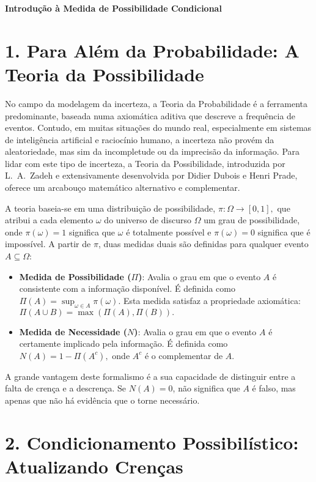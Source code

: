 \documentclass[a4paper]{article}
\begin{document}
    \begin{answer}[Questão 01]


\textbf{Introdução à Medida de Possibilidade Condicional}

\section*{1. Para Além da Probabilidade: A Teoria da Possibilidade}

No campo da modelagem da incerteza, a Teoria da Probabilidade é a ferramenta predominante, baseada numa axiomática aditiva que descreve a frequência de eventos. Contudo, em muitas situações do mundo real, especialmente em sistemas de inteligência artificial e raciocínio humano, a incerteza não provém da aleatoriedade, mas sim da incompletude ou da imprecisão da informação. Para lidar com este tipo de incerteza, a Teoria da Possibilidade, introduzida por L.~A.~Zadeh e extensivamente desenvolvida por Didier Dubois e Henri Prade, oferece um arcabouço matemático alternativo e complementar.

A teoria baseia-se em uma distribuição de possibilidade, 
\(
\pi : \Omega \to [0,1],
\)
que atribui a cada elemento $\omega$ do universo de discurso $\Omega$ um grau de possibilidade, onde $\pi(\omega) = 1$ significa que $\omega$ é totalmente possível e $\pi(\omega) = 0$ significa que é impossível. A partir de $\pi$, duas medidas duais são definidas para qualquer evento $A \subseteq \Omega$:

\begin{itemize}
  \item \textbf{Medida de Possibilidade ($\Pi$)}: Avalia o grau em que o evento $A$ é consistente com a informação disponível. É definida como
  \(
  \Pi(A) = \sup_{\omega \in A} \pi(\omega).
  \)
  Esta medida satisfaz a propriedade axiomática:
  \(
  \Pi(A \cup B) = \max(\Pi(A), \Pi(B)).
  \)

  \item \textbf{Medida de Necessidade ($N$)}: Avalia o grau em que o evento $A$ é certamente implicado pela informação. É definida como
  \(
  N(A) = 1 - \Pi(A^c),
  \)
  onde $A^c$ é o complementar de $A$.
\end{itemize}

A grande vantagem deste formalismo é a sua capacidade de distinguir entre a falta de crença e a descrença. Se $N(A)=0$, não significa que $A$ é falso, mas apenas que não há evidência que o torne necessário.

\section*{2. Condicionamento Possibilístico: Atualizando Crenças}


\end{answer}
\end{document}
